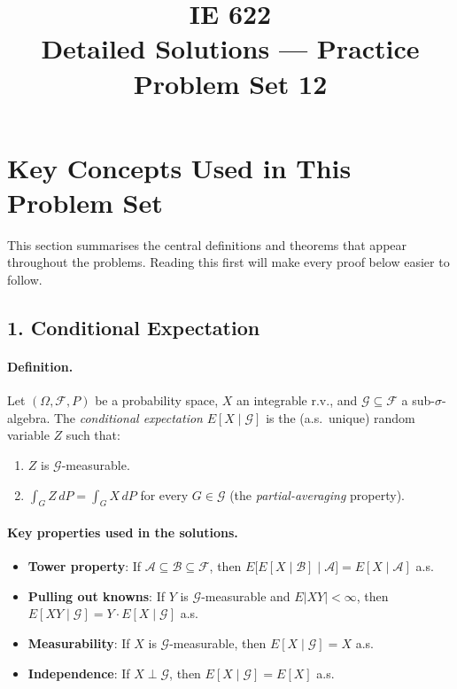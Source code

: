 \documentclass[11pt]{article}
\title{IE 622 \\ Detailed Solutions --- Practice Problem Set 12}
\author{}
\date{}
\newcommand{\F}{\mathcal{F}}
\newcommand{\G}{\mathcal{G}}
\newcommand{\1}{\mathbf{1}}
\theoremstyle{plain}
\begin{document}
\maketitle

\section*{Key Concepts Used in This Problem Set}

This section summarises the central definitions and theorems that appear
throughout the problems. Reading this first will make every proof below
easier to follow.

\subsection*{1. Conditional Expectation}

\paragraph{Definition.}
Let $(\Omega,\F,P)$ be a probability space, $X$ an integrable r.v., and
$\G\subseteq\F$ a sub-$\sigma$-algebra. The \emph{conditional expectation}
$E[X\mid\G]$ is the (a.s.\ unique) random variable $Z$ such that:
\begin{enumerate}
  \item $Z$ is $\G$-measurable.
  \item $\displaystyle\int_G Z\,dP = \int_G X\,dP$ for every $G\in\G$
        \quad(the \emph{partial-averaging} property).
\end{enumerate}

\paragraph{Key properties used in the solutions.}
\begin{itemize}
  \item \textbf{Tower property}: If $\mathcal{A}\subseteq\mathcal{B}\subseteq\F$,
        then $E\bigl[E[X\mid\mathcal{B}]\mid\mathcal{A}\bigr]=E[X\mid\mathcal{A}]$ a.s.
  \item \textbf{Pulling out knowns}: If $Y$ is $\G$-measurable and $E|XY|<\infty$,
        then $E[XY\mid\G]=Y\cdot E[X\mid\G]$ a.s.
  \item \textbf{Measurability}: If $X$ is $\G$-measurable, then $E[X\mid\G]=X$ a.s.
  \item \textbf{Independence}: If $X\perp\G$, then $E[X\mid\G]=E[X]$ a.s.
\end{itemize}
\end{document}
